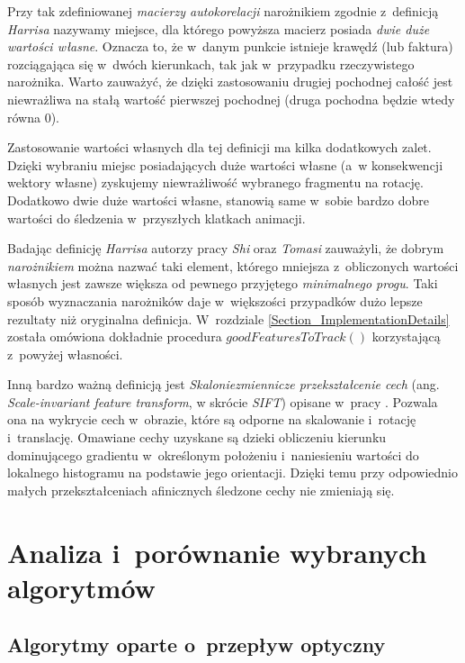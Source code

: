     Przy tak zdefiniowanej \textit{macierzy autokorelacji} narożnikiem zgodnie z~definicją \textit{Harrisa} nazywamy miejsce, dla którego powyższa macierz posiada \textit{dwie duże wartości własne}. Oznacza to, że w~danym punkcie istnieje krawędź (lub faktura) rozciągająca się w~dwóch kierunkach, tak jak w~przypadku rzeczywistego narożnika. Warto zauważyć, że dzięki zastosowaniu drugiej pochodnej całość jest niewrażliwa na stałą wartość pierwszej pochodnej (druga pochodna będzie wtedy równa $0$).

    Zastosowanie wartości własnych dla tej definicji ma kilka dodatkowych zalet. Dzięki wybraniu miejsc posiadających duże wartości własne (a~w konsekwencji wektory własne) zyskujemy niewrażliwość wybranego fragmentu na rotację. Dodatkowo dwie duże wartości własne, stanowią same w~sobie bardzo dobre wartości do śledzenia w~przyszłych klatkach animacji.

    Badając definicję \textit{Harrisa} autorzy pracy \cite{GoodFeaturesToTrack94} \textit{Shi} oraz \textit{Tomasi} zauważyli, że dobrym \textit{narożnikiem} można nazwać taki element, którego mniejsza z~obliczonych wartości własnych jest zawsze większa od pewnego przyjętego \textit{minimalnego progu}. Taki sposób wyznaczania narożników daje w~większości przypadków dużo lepsze rezultaty niż oryginalna definicja. W~rozdziale \ref{Section_ImplementationDetails} została omówiona dokładnie procedura $goodFeaturesToTrack()$ korzystającą z~powyżej własności.

    Inną bardzo ważną definicją jest \textit{Skaloniezmiennicze przekształcenie cech} (ang. \textit{Scale-invariant feature transform}, w skrócie \textit{SIFT}) opisane w~pracy \cite{SalientPointsTracking05}. Pozwala ona na wykrycie cech w~obrazie, które są odporne na skalowanie i~rotację i~translację. Omawiane cechy uzyskane są dzieki obliczeniu kierunku dominującego gradientu w~określonym położeniu i~naniesieniu wartości do lokalnego histogramu na podstawie jego orientacji. Dzięki temu przy odpowiednio małych przekształceniach afinicznych śledzone cechy nie zmieniają się.

\chapter{Analiza i~porównanie wybranych algorytmów}\label{Section_Algorytmy}

  \section{Algorytmy oparte o~przepływ optyczny}\label{Subsection_OpticalFlow}

